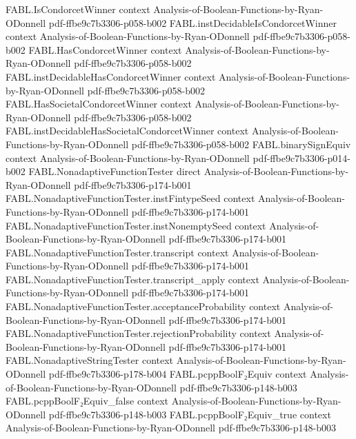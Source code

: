 \begin{theorem}
\proofstep
  {FABL.IsCondorcetWinner}
  {context}
  {Analysis-of-Boolean-Functions-by-Ryan-ODonnell}
  {pdf-ffbe9c7b3306-p058-b002}
\proofstep
  {FABL.instDecidableIsCondorcetWinner}
  {context}
  {Analysis-of-Boolean-Functions-by-Ryan-ODonnell}
  {pdf-ffbe9c7b3306-p058-b002}
\proofstep
  {FABL.HasCondorcetWinner}
  {context}
  {Analysis-of-Boolean-Functions-by-Ryan-ODonnell}
  {pdf-ffbe9c7b3306-p058-b002}
\proofstep
  {FABL.instDecidableHasCondorcetWinner}
  {context}
  {Analysis-of-Boolean-Functions-by-Ryan-ODonnell}
  {pdf-ffbe9c7b3306-p058-b002}
\proofstep
  {FABL.HasSocietalCondorcetWinner}
  {context}
  {Analysis-of-Boolean-Functions-by-Ryan-ODonnell}
  {pdf-ffbe9c7b3306-p058-b002}
\proofstep
  {FABL.instDecidableHasSocietalCondorcetWinner}
  {context}
  {Analysis-of-Boolean-Functions-by-Ryan-ODonnell}
  {pdf-ffbe9c7b3306-p058-b002}
\proofstep
  {FABL.binarySignEquiv}
  {context}
  {Analysis-of-Boolean-Functions-by-Ryan-ODonnell}
  {pdf-ffbe9c7b3306-p014-b002}
\proofstep
  {FABL.NonadaptiveFunctionTester}
  {direct}
  {Analysis-of-Boolean-Functions-by-Ryan-ODonnell}
  {pdf-ffbe9c7b3306-p174-b001}
\proofstep
  {FABL.NonadaptiveFunctionTester.instFintypeSeed}
  {context}
  {Analysis-of-Boolean-Functions-by-Ryan-ODonnell}
  {pdf-ffbe9c7b3306-p174-b001}
\proofstep
  {FABL.NonadaptiveFunctionTester.instNonemptySeed}
  {context}
  {Analysis-of-Boolean-Functions-by-Ryan-ODonnell}
  {pdf-ffbe9c7b3306-p174-b001}
\proofstep
  {FABL.NonadaptiveFunctionTester.transcript}
  {context}
  {Analysis-of-Boolean-Functions-by-Ryan-ODonnell}
  {pdf-ffbe9c7b3306-p174-b001}
\proofstep
  {FABL.NonadaptiveFunctionTester.transcript_apply}
  {context}
  {Analysis-of-Boolean-Functions-by-Ryan-ODonnell}
  {pdf-ffbe9c7b3306-p174-b001}
\proofstep
  {FABL.NonadaptiveFunctionTester.acceptanceProbability}
  {context}
  {Analysis-of-Boolean-Functions-by-Ryan-ODonnell}
  {pdf-ffbe9c7b3306-p174-b001}
\proofstep
  {FABL.NonadaptiveFunctionTester.rejectionProbability}
  {context}
  {Analysis-of-Boolean-Functions-by-Ryan-ODonnell}
  {pdf-ffbe9c7b3306-p174-b001}
\proofstep
  {FABL.NonadaptiveStringTester}
  {context}
  {Analysis-of-Boolean-Functions-by-Ryan-ODonnell}
  {pdf-ffbe9c7b3306-p178-b004}
\proofstep
  {FABL.pcppBoolF₂Equiv}
  {context}
  {Analysis-of-Boolean-Functions-by-Ryan-ODonnell}
  {pdf-ffbe9c7b3306-p148-b003}
\proofstep
  {FABL.pcppBoolF₂Equiv_false}
  {context}
  {Analysis-of-Boolean-Functions-by-Ryan-ODonnell}
  {pdf-ffbe9c7b3306-p148-b003}
\proofstep
  {FABL.pcppBoolF₂Equiv_true}
  {context}
  {Analysis-of-Boolean-Functions-by-Ryan-ODonnell}
  {pdf-ffbe9c7b3306-p148-b003}

\end{theorem}

